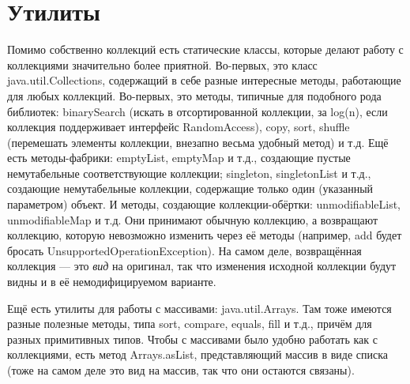 \documentclass[a5paper]{article}
\begin{document}
\section{Утилиты}

Помимо собственно коллекций есть статические классы, которые делают работу с коллекциями значительно более приятной. Во-первых, это класс java.util.Collections, содержащий в себе разные интересные методы, работающие для любых коллекций. Во-первых, это методы, типичные для подобного рода библиотек: binarySearch (искать в отсортированной коллекции, за log(n), если коллекция поддерживает интерфейс RandomAccess), copy, sort, shuffle (перемешать элементы коллекции, внезапно весьма удобный метод) и т.д. Ещё есть методы-фабрики: emptyList, emptyMap и т.д., создающие пустые немутабельные соответствующие коллекции; singleton, singletonList и т.д., создающие немутабельные коллекции, содержащие только один (указанный параметром) объект. И методы, создающие коллекции-обёртки: unmodifiableList, unmodifiableMap и т.д. Они принимают обычную коллекцию, а возвращают коллекцию, которую невозможно изменить через её методы (например, add будет бросать UnsupportedOperationException). На самом деле, возвращённая коллекция --- это \textit{вид} на оригинал, так что изменения исходной коллекции будут видны и в её немодифицируемом варианте.

Ещё есть утилиты для работы с массивами: java.util.Arrays. Там тоже имеются разные полезные методы, типа sort, compare, equals, fill и т.д., причём для разных примитивных типов. Чтобы с массивами было удобно работать как с коллекциями, есть метод Arrays.asList, представляющий массив в виде списка (тоже на самом деле это вид на массив, так что они остаются связаны).
\end{document}
